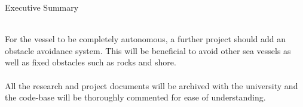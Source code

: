 \begin{Summary}{Executive Summary}
\begin{SumTable}
 \hline%
 \\
 \hline%
    For the vessel to be completely autonomous, a further project should add an obstacle avoidance system. This will be beneficial to avoid other sea vessels as well as fixed obstacles such as rocks and shore.\\

 \hline%
 \\
 \hline%
   All the research and project documents will be archived with the university and the code-base will be thoroughly commented for ease of understanding.\\

 \hline%
\end{SumTable}


\vspace{1.5cm}
\SumSignatures

\end{Summary}

\endinput
